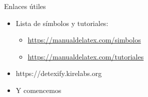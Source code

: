 \documentclass{beamer}
\begin{document}
\begin{frame}

  Enlaces \'utiles
  \vspace{10px}
  

  \begin{itemize}
  \item Lista de s\'imbolos y tutoriales:
    \begin{itemize}
    \item \url{https://manualdelatex.com/simbolos}
    \item \url{https://manualdelatex.com/tutoriales}
    \end{itemize}
  \item https://detexify.kirelabs.org
  \item Y comencemos
  \end{itemize}
  
\end{frame}
\end{document}
